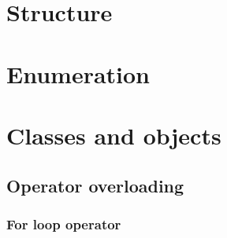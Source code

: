 \section{Structure}%
\label{sec:structs}

\vfill%
\pagebreak

\section{Enumeration}%
\label{sec:enum}

\vfill%
\pagebreak

\section{Classes and objects}%
\label{sec:classes}

\subsection{Operator overloading}
\subsubsection {For loop operator}
\label{sec:for_loop_override}
